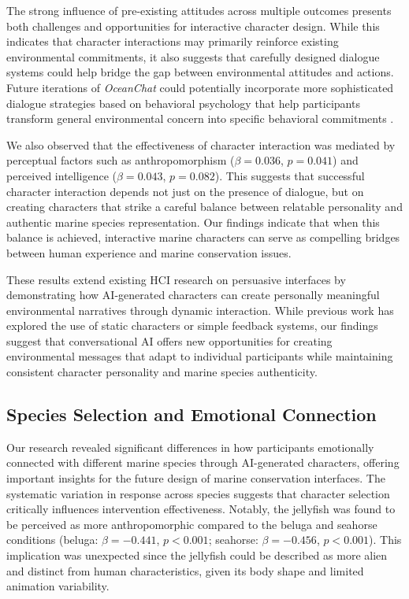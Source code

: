 \documentclass[sigconf, nonacm]{acmart}
\begin{document}
The strong influence of pre-existing attitudes across multiple outcomes presents both challenges and opportunities for interactive character design. While this indicates that character interactions may primarily reinforce existing environmental commitments, it also suggests that carefully designed dialogue systems could help bridge the gap between environmental attitudes and actions. Future iterations of \textit{OceanChat} could potentially incorporate more sophisticated dialogue strategies based on behavioral psychology that help participants transform general environmental concern into specific behavioral commitments \cite{Ajzen1991, Gifford2011b, Gifford2011a, Thaler2008}.

We also observed that the effectiveness of character interaction was mediated by perceptual factors such as anthropomorphism ($\beta = 0.036$, $p = 0.041$) and perceived intelligence ($\beta = 0.043$, $p = 0.082$). This suggests that successful character interaction depends not just on the presence of dialogue, but on creating characters that strike a careful balance between relatable personality and authentic marine species representation. Our findings indicate that when this balance is achieved, interactive marine characters can serve as compelling bridges between human experience and marine conservation issues.

These results extend existing HCI research on persuasive interfaces by demonstrating how AI-generated characters can create personally meaningful environmental narratives through dynamic interaction. While previous work has explored the use of static characters or simple feedback systems, our findings suggest that conversational AI offers new opportunities for creating environmental messages that adapt to individual participants while maintaining consistent character personality and marine species authenticity.

\subsection*{Species Selection and Emotional Connection}
Our research revealed significant differences in how participants emotionally connected with different marine species through AI-generated characters, offering important insights for the future design of marine conservation interfaces. The systematic variation in response across species suggests that character selection critically influences intervention effectiveness. Notably, the jellyfish was found to be perceived as more anthropomorphic compared to the beluga and seahorse conditions (beluga: $\beta = -0.441$, $p < 0.001$; seahorse: $\beta = -0.456$, $p < 0.001$). This implication was unexpected since the jellyfish could be described as more alien and distinct from human characteristics, given its body shape and limited animation variability.
\end{document}
